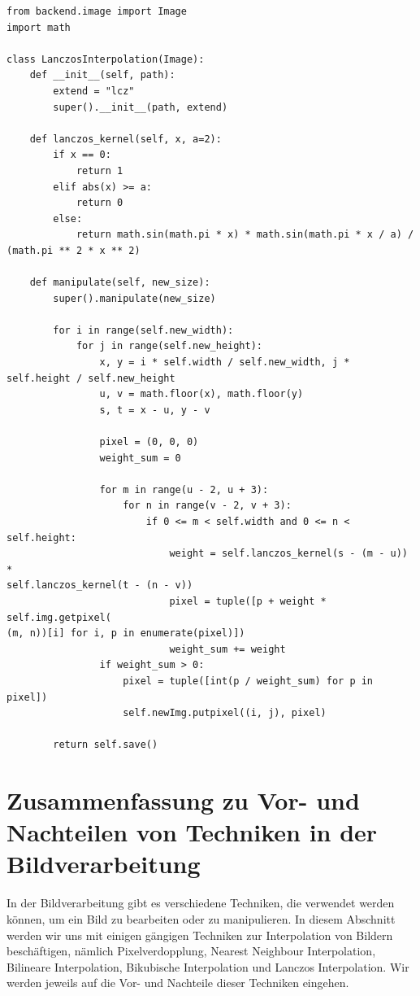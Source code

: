 \begin{lstlisting}
from backend.image import Image
import math

class LanczosInterpolation(Image):
    def __init__(self, path):
        extend = "lcz"
        super().__init__(path, extend)

    def lanczos_kernel(self, x, a=2):
        if x == 0:
            return 1
        elif abs(x) >= a:
            return 0
        else:
            return math.sin(math.pi * x) * math.sin(math.pi * x / a) /
(math.pi ** 2 * x ** 2)

    def manipulate(self, new_size):
        super().manipulate(new_size)

        for i in range(self.new_width):
            for j in range(self.new_height):
                x, y = i * self.width / self.new_width, j *
self.height / self.new_height
                u, v = math.floor(x), math.floor(y)
                s, t = x - u, y - v

                pixel = (0, 0, 0)
                weight_sum = 0

                for m in range(u - 2, u + 3):
                    for n in range(v - 2, v + 3):
                        if 0 <= m < self.width and 0 <= n < self.height:
                            weight = self.lanczos_kernel(s - (m - u)) *
self.lanczos_kernel(t - (n - v))
                            pixel = tuple([p + weight * self.img.getpixel(
(m, n))[i] for i, p in enumerate(pixel)])
                            weight_sum += weight
                if weight_sum > 0:
                    pixel = tuple([int(p / weight_sum) for p in pixel])
                    self.newImg.putpixel((i, j), pixel)

        return self.save()
\end{lstlisting}

\section{Zusammenfassung zu Vor- und Nachteilen von Techniken in der Bildverarbeitung}

In der Bildverarbeitung gibt es verschiedene Techniken, die verwendet werden können, um ein Bild zu bearbeiten oder zu manipulieren. 
In diesem Abschnitt werden wir uns mit einigen gängigen Techniken zur Interpolation von Bildern beschäftigen, nämlich Pixelverdopplung, Nearest Neighbour Interpolation, Bilineare Interpolation, Bikubische Interpolation und Lanczos Interpolation. 
Wir werden jeweils auf die Vor- und Nachteile dieser Techniken eingehen.

